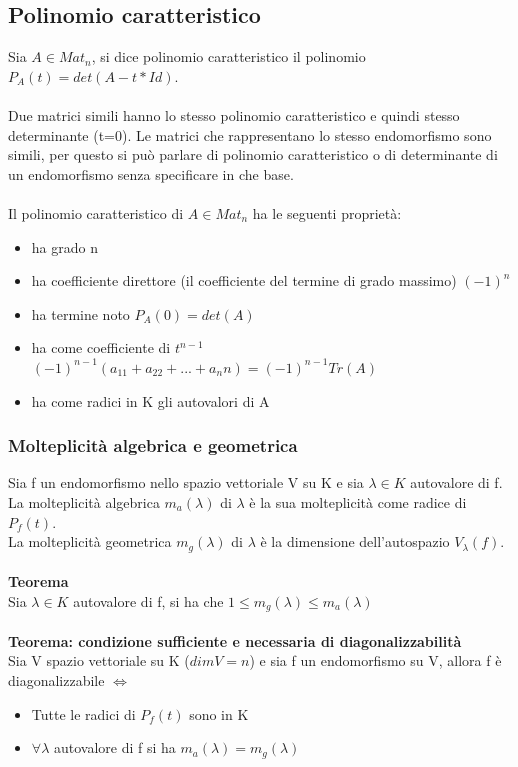 \documentclass{article}
\begin{document}
\subsection{Polinomio caratteristico}
Sia $A\in Mat_n$, si dice polinomio caratteristico il polinomio $P_A(t)=det(A-t *Id)$.\\\\
Due matrici simili hanno lo stesso polinomio caratteristico e quindi stesso determinante (t=0). Le matrici che rappresentano lo stesso endomorfismo sono simili, per questo si può parlare di polinomio caratteristico o di determinante di un endomorfismo senza specificare in che base.\\\\
Il polinomio caratteristico di $A\in Mat_n$ ha le seguenti proprietà:
\begin{itemize}
    \item ha grado n
    \item ha coefficiente direttore (il coefficiente del termine di grado massimo) $(-1)^n$
    \item ha termine noto $P_A(0)=det(A)$
    \item ha come coefficiente di $t^{n-1}$ $(-1)^{n-1}(a_11+a_22+...+a_nn)=(-1)^{n-1} Tr(A)$
    \item ha come radici in K gli autovalori di A
\end{itemize}

\subsubsection{Molteplicità algebrica e geometrica}
Sia f un endomorfismo nello spazio vettoriale V su K e sia $\lambda\in K$ autovalore di f.\\
La molteplicità algebrica $m_a(\lambda)$ di $\lambda$ è la sua molteplicità come radice di $P_f(t)$.\\
La molteplicità geometrica $m_g(\lambda)$ di $\lambda$ è la dimensione dell'autospazio $V_\lambda(f)$.\\\\
\textbf{Teorema}\\
Sia $\lambda\in K$ autovalore di f, si ha che $1\leq m_g(\lambda)\leq m_a(\lambda)$\\\\
\textbf{Teorema: condizione sufficiente e necessaria di diagonalizzabilità}\\
Sia V spazio vettoriale su K ($dimV=n$) e sia f un endomorfismo su V, allora f è diagonalizzabile $\Leftrightarrow$ \begin{itemize}
    \item Tutte le radici di $P_f(t)$ sono in K
    \item $\forall \lambda$ autovalore di f si ha $m_a(\lambda)=m_g(\lambda)$
\end{itemize}
\end{document}
